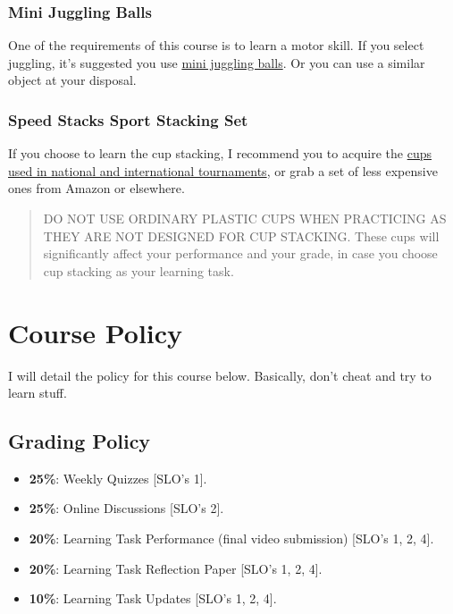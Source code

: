 \documentclass[11pt,]{article}
\begin{document}
\hypertarget{mini-juggling-balls}{%
\subsubsection{Mini Juggling Balls}\label{mini-juggling-balls}}

One of the requirements of this course is to learn a motor skill. If you
select juggling, it's suggested you use \href{http://goo.gl/X3EjLE}{mini
juggling balls}. Or you can use a similar object at your disposal.

\hypertarget{speed-stacks-sport-stacking-set}{%
\subsubsection{Speed Stacks Sport Stacking
Set}\label{speed-stacks-sport-stacking-set}}

If you choose to learn the cup stacking, I recommend you to acquire the
\href{http://goo.gl/Y8HXt5}{cups used in national and international
tournaments}, or grab a set of less expensive ones from Amazon or
elsewhere.

\begin{quote}
DO NOT USE ORDINARY PLASTIC CUPS WHEN PRACTICING AS THEY ARE NOT
DESIGNED FOR CUP STACKING. These cups will significantly affect your
performance and your grade, in case you choose cup stacking as your
learning task.
\end{quote}

\hypertarget{course-policy}{%
\section{Course Policy}\label{course-policy}}

I will detail the policy for this course below. Basically, don't cheat
and try to learn stuff.

\hypertarget{grading-policy}{%
\subsection{Grading Policy}\label{grading-policy}}

\begin{itemize}
\item
  \textbf{25\%}: Weekly Quizzes {[}SLO's 1{]}.
\item
  \textbf{25\%}: Online Discussions {[}SLO's 2{]}.
\item
  \textbf{20\%}: Learning Task Performance (final video submission)
  {[}SLO's 1, 2, 4{]}.
\item
  \textbf{20\%}: Learning Task Reflection Paper {[}SLO's 1, 2, 4{]}.
\item
  \textbf{10\%}: Learning Task Updates {[}SLO's 1, 2, 4{]}.
\end{itemize}
\end{document}
